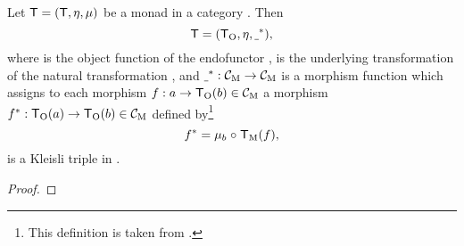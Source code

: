 \begin{lemma}
  \label{lem:monad-to-triple}

  Let $\mathsf{T} = (\mathsf{T}, \eta, \mu)$ be a monad in a
  category . Then
  \begin{equation*}
    \mathsf{T} = (\mathsf{T}_{\operatorname{O}}, \eta, \underline{~}^*)
    \text{,}
  \end{equation*}
  where  is the object function of the endofunctor ,
  \nat{\eta} is the underlying transformation of the natural
  transformation \nat{\eta}, and $\underline{~}^*: \mathcal{C}_{\operatorname{M}} \to \mathcal{C}_{\operatorname{M}}$
  is a morphism function which assigns to each morphism $f : a \to
  \mathsf{T}_{\operatorname{O}}(b) \in \mathcal{C}_{\operatorname{M}}$ a morphism $f^*: \mathsf{T}_{\operatorname{O}}(a) \to
  \mathsf{T}_{\operatorname{O}}(b) \in \mathcal{C}_{\operatorname{M}}$ defined by\footnote{This definition is
    taken from \parencite[61]{moggi-1991}.}
  \begin{equation}
    \label{eq:monad-to-triple-extension}
    f^* = \mu_{b} \mathrel{\circ} \mathsf{T}_{\operatorname{M}}(f)
    \text{,}
  \end{equation}
  is a Kleisli triple in .

  \begin{proof}


\end{proof}
\end{lemma}
